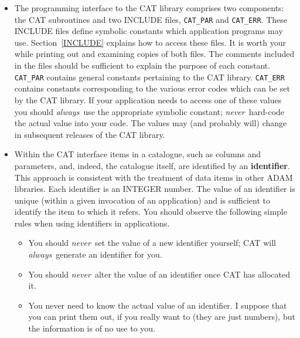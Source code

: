 \begin{itemize}

  \item The programming interface to the CAT library comprises two
   components: the CAT subroutines and two INCLUDE files, {\tt CAT\_PAR}
   and {\tt CAT\_ERR}. These INCLUDE files define symbolic constants
   which application programs may use. Section~\ref{INCLUDE} explains
   how to access these files. It is worth your while printing out and
   examining copies of both files. The comments included in the files
   should be sufficient to explain the purpose of each constant. {\tt
   CAT\_PAR} contains general constants pertaining to the CAT library.
   {\tt CAT\_ERR} contains constants corresponding to the various error
   codes which can be set by the CAT library. If your application needs
   to access one of these values you should {\it always}\, use the
   appropriate symbolic constant; {\it never}\, hard-code the actual
   value into your code. The values may (and probably will) change in
   subsequent releases of the CAT library.

  \item Within the CAT interface items in a catalogue, such as columns
   and parameters, and, indeed, the catalogue itself, are identified
   by an {\bf identifier}. This approach is consistent with the
   treatment of data items in other ADAM libraries. Each identifier is
   an INTEGER number. The value of an identifier is unique (within a
   given invocation of an application) and is sufficient to identify
   the item to which it refers. You should observe the following simple
   rules when using identifiers in applications.

  \begin{itemize}

    \item You should {\it never}\, set the value of a new identifier
     yourself; CAT will {\it always}\, generate an identifier for you.

    \item You should {\it never}\, alter the value of an identifier
     once CAT has allocated it.

    \item You never need to know the actual value of an identifier. I
     suppose that you can print them out, if you really want to (they
     are just numbers), but the information is of no use to you.

  \end{itemize}


\end{itemize}
